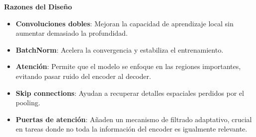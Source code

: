\begin{enumerate}
\begin{itemize}
  
  

\textbf{Razones del Diseño}
\begin{itemize}
    \item \textbf{Convoluciones dobles}: Mejoran la capacidad de aprendizaje local sin aumentar demasiado la profundidad.
  
    \item \textbf{BatchNorm}: Acelera la convergencia y estabiliza el entrenamiento.
    \item \textbf{Atención}: Permite que el modelo se enfoque en las regiones importantes, evitando pasar ruido del encoder al decoder.
    \item \textbf{Skip connections}: Ayudan a recuperar detalles espaciales perdidos por el pooling.
    \item \textbf{Puertas de atención}: Añaden un mecanismo de filtrado adaptativo, crucial en tareas donde no toda la información del encoder es igualmente relevante.
      

\end{itemize}
\end{itemize}
\end{enumerate}
